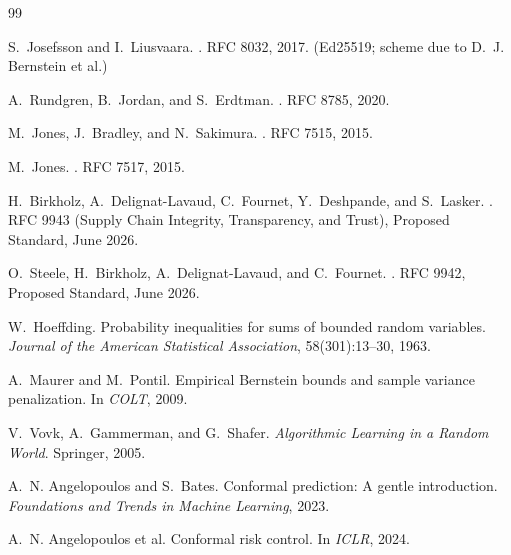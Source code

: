 \documentclass[11pt]{article}
\theoremstyle{definition}
\begin{document}
\begin{thebibliography}{99}

S.~Josefsson and I.~Liusvaara.
.
\newblock RFC 8032, 2017.
\newblock (Ed25519; scheme due to D.~J. Bernstein et al.)

A.~Rundgren, B.~Jordan, and S.~Erdtman.
.
\newblock RFC 8785, 2020.

M.~Jones, J.~Bradley, and N.~Sakimura.
.
\newblock RFC 7515, 2015.

M.~Jones.
.
\newblock RFC 7517, 2015.

H.~Birkholz, A.~Delignat-Lavaud, C.~Fournet, Y.~Deshpande, and S.~Lasker.
.
\newblock RFC 9943 (Supply Chain Integrity, Transparency, and Trust),
Proposed Standard, June 2026.

O.~Steele, H.~Birkholz, A.~Delignat-Lavaud, and C.~Fournet.
.
\newblock RFC 9942, Proposed Standard, June 2026.

W.~Hoeffding.
\newblock Probability inequalities for sums of bounded random variables.
\newblock \emph{Journal of the American Statistical Association},
  58(301):13--30, 1963.

A.~Maurer and M.~Pontil.
\newblock Empirical {B}ernstein bounds and sample variance penalization.
\newblock In \emph{COLT}, 2009.

V.~Vovk, A.~Gammerman, and G.~Shafer.
\newblock \emph{Algorithmic Learning in a Random World}.
\newblock Springer, 2005.

A.~N. Angelopoulos and S.~Bates.
\newblock Conformal prediction: A gentle introduction.
\newblock \emph{Foundations and Trends in Machine Learning}, 2023.

A.~N. Angelopoulos et al.
\newblock Conformal risk control.
\newblock In \emph{ICLR}, 2024.


\end{thebibliography}
\end{document}
